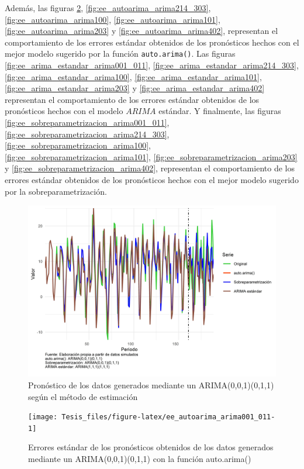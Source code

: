 \documentclass[
]{article}
\begin{document}
Además, las figuras \ref{fig:ee_autoarima_arima001_011},
\ref{fig:ee_autoarima_arima214_303}, \ref{fig:ee_autoarima_arima100},
\ref{fig:ee_autoarima_arima101}, \ref{fig:ee_autoarima_arima203} y
\ref{fig:ee_autoarima_arima402}, representan el comportamiento de los
errores estándar obtenidos de los pronósticos hechos con el mejor modelo
sugerido por la función \texttt{auto.arima()}. Las figuras
\ref{fig:ee_arima_estandar_arima001_011},
\ref{fig:ee_arima_estandar_arima214_303},
\ref{fig:ee_arima_estandar_arima100},
\ref{fig:ee_arima_estandar_arima101},
\ref{fig:ee_arima_estandar_arima203} y
\ref{fig:ee_arima_estandar_arima402} representan el comportamiento de
los errores estándar obtenidos de los pronósticos hechos con el modelo
\(ARIMA\) estándar. Y finalmente, las figuras
\ref{fig:ee_sobreparametrizacion_arima001_011},
\ref{fig:ee_sobreparametrizacion_arima214_303},
\ref{fig:ee_sobreparametrizacion_arima100},
\ref{fig:ee_sobreparametrizacion_arima101},
\ref{fig:ee_sobreparametrizacion_arima203} y
\ref{fig:ee_sobreparametrizacion_arima402}, representan el
comportamiento de los errores estándar obtenidos de los pronósticos
hechos con el mejor modelo sugerido por la sobreparametrización.

\begin{figure}[H]
\includegraphics[width=1\linewidth,height=1\textheight]{Tesis_files/figure-latex/pronostico_arima001_011-1} \caption{Pronóstico de los datos generados mediante un ARIMA(0,0,1)(0,1,1) según el método de estimación}\label{fig:pronostico_arima001_011}
\end{figure}

\begin{figure}[H]
\texttt{[image: Tesis\_files/figure-latex/ee\_autoarima\_arima001\_011-1]} \caption{Errores estándar de los pronósticos obtenidos de los datos generados mediante un ARIMA(0,0,1)(0,1,1) con la función auto.arima()}\label{fig:ee_autoarima_arima001_011}
\end{figure}
\end{document}
